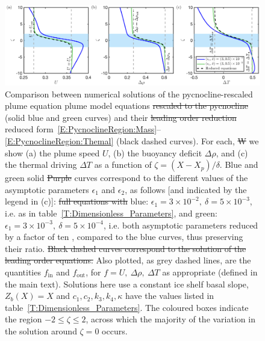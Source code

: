 \documentclass[openacc]{rsproca_new}%
\newcommand{\red}[1]{{\color{red} #1}}
\newcommand{\blue}[1]{{\color{blue} #1}}
\newcommand{\rout}[1]{\red{\st{#1}}}\newcommand{\ab}[1]{\textcolor{Green}{#1}}\newcommand{\about}[1]{\textcolor{Cyan}{\sout{#1}}}
\newcommand{\epsone}{\epsilon_{1}} %
\newcommand{\epstwo}{\epsilon_{2}} %
\newcommand{\lt}{\delta} %
\renewcommand{\in}{\text{in}} %
\newcommand{\out}{\text{out}}
\begin{document}
\begin{figure}
\centering
\includegraphics[width = \textwidth]{./make_plots/plots/figure4.png}
\caption{Comparison between numerical solutions of the \blue{pycnocline-rescaled plume equation} \blue{plume model} equations \rout{rescaled to the pycnocline}\blue{(solid blue and green curves)} and their \rout{leading order reduction }\blue{reduced form}~\eqref{E:PycnoclineRegion:Mass}--\eqref{E:PycnoclineRegion:Themal} \blue{(black dashed curves)}. \blue{For each,} \rout{W}\blue{w}e show (a) \blue{the} plume speed $U$, (b) \blue{the} buoyancy deficit $\Delta \rho$, and (c) \blue{the} thermal driving $\Delta T$ \blue{as a function of $\zeta = (X - X_p)/\delta$}. \blue{Blue and green solid}\rout{ Purple} curves correspond to the \blue{different values of the asymptotic parameters $\epsone$ and $\epstwo$, as follows [and indicated by the legend in (c)]:} \rout{full equations with} \blue{blue:} $\epsone = 3\times10^{-2}, ~\lt = 5\times10^{-3}$, i.e. as in table~\ref{T:Dimensionless_Parameters}, and \blue{green:} $\epsone = 3\times10^{-3},~ \lt = 5\times10^{-4}$, i.e. both asymptotic parameters reduced by a factor of ten\blue{, compared to the blue curves,} thus preserving their ratio. \rout{Black dashed curves correspond to the solution of the leading order equations.} Also plotted, as grey dashed lines, are the quantities $f_{\in}$ and $f_{\out}$, for $f = U,~ \Delta \rho, ~\Delta T$ as appropriate (defined in the main text). Solutions here use a constant ice shelf basal slope, $Z_b(X) = X$ and $c_1, c_2, k_3,k_4, \kappa$ have the values listed in table~\ref{T:Dimensionless_Parameters}. The coloured boxes indicate the region $-2 \leq \zeta  \leq 2$, across which the majority of the variation in the solution around $\zeta = 0 $ occurs.}\label{fig:PycnoclineAsymptotics}
\end{figure}
\end{document}
